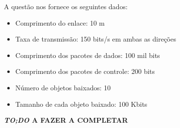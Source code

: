 \documentclass{homework}
\begin{document}
\begin{exercise}[P10)]
A questão nos fornece os seguintes dados:
\begin{itemize}
    \item Comprimento do enlace: 10 m
    \item Taxa de transmissão: 150 bits/s em ambas as direções
    \item Comprimento dos pacotes de dados: 100 mil bits
    \item Comprimento dos pacotes de controle: 200 bits
    \item Número de objetos baixados: 10
    \item Tamanho de cada objeto baixado: 100 Kbits
\end{itemize}
\begin{center}
\Huge{\textbf{\textit{TO;DO} A FAZER A COMPLETAR}}
    
\end{center}


\end{exercise}
\end{document}
